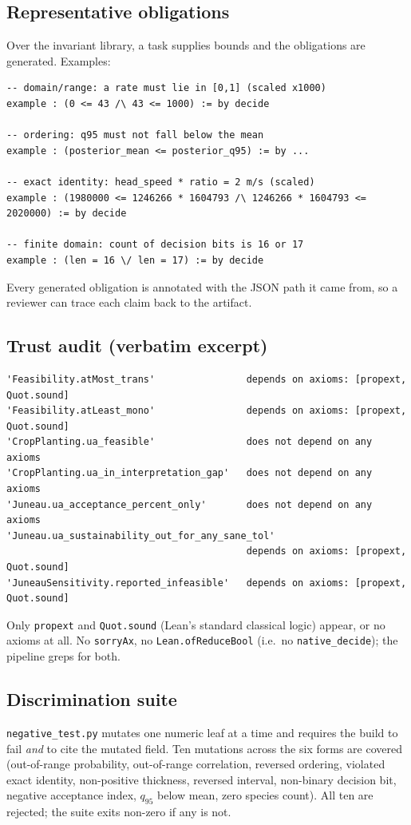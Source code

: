 \subsection{Representative obligations}
Over the invariant library, a task supplies bounds and the obligations are
generated. Examples:
\begin{verbatim}
-- domain/range: a rate must lie in [0,1] (scaled x1000)
example : (0 <= 43 /\ 43 <= 1000) := by decide

-- ordering: q95 must not fall below the mean
example : (posterior_mean <= posterior_q95) := by ...

-- exact identity: head_speed * ratio = 2 m/s (scaled)
example : (1980000 <= 1246266 * 1604793 /\ 1246266 * 1604793 <= 2020000) := by decide

-- finite domain: count of decision bits is 16 or 17
example : (len = 16 \/ len = 17) := by decide
\end{verbatim}
Every generated obligation is annotated with the JSON path it came from, so a
reviewer can trace each claim back to the artifact.

\subsection{Trust audit (verbatim excerpt)}
\begin{verbatim}
'Feasibility.atMost_trans'                depends on axioms: [propext, Quot.sound]
'Feasibility.atLeast_mono'                depends on axioms: [propext, Quot.sound]
'CropPlanting.ua_feasible'                does not depend on any axioms
'CropPlanting.ua_in_interpretation_gap'   does not depend on any axioms
'Juneau.ua_acceptance_percent_only'       does not depend on any axioms
'Juneau.ua_sustainability_out_for_any_sane_tol'
                                          depends on axioms: [propext, Quot.sound]
'JuneauSensitivity.reported_infeasible'   depends on axioms: [propext, Quot.sound]
\end{verbatim}
Only \texttt{propext} and \texttt{Quot.sound} (Lean's standard classical logic)
appear, or no axioms at all. No \texttt{sorryAx}, no \texttt{Lean.ofReduceBool}
(i.e.\ no \texttt{native\_decide}); the pipeline greps for both.

\subsection{Discrimination suite}
\texttt{negative\_test.py} mutates one numeric leaf at a time and requires the
build to fail \emph{and} to cite the mutated field. Ten mutations across the six
forms are covered (out-of-range probability, out-of-range correlation, reversed
ordering, violated exact identity, non-positive thickness, reversed interval,
non-binary decision bit, negative acceptance index, $q_{95}$ below mean, zero
species count). All ten are rejected; the suite exits non-zero if any is not.

